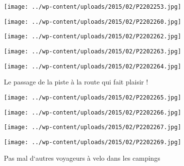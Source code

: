  

\begin{center} \texttt{[image: ../wp-content/uploads/2015/02/P2202253.jpg]} \end{center}

 

\begin{center} \texttt{[image: ../wp-content/uploads/2015/02/P2202260.jpg]} \end{center}

 

\begin{center} \texttt{[image: ../wp-content/uploads/2015/02/P2202262.jpg]} \end{center}

 

\begin{center} \texttt{[image: ../wp-content/uploads/2015/02/P2202263.jpg]} \end{center}

 

\begin{center} \texttt{[image: ../wp-content/uploads/2015/02/P2202264.jpg]} \end{center}

Le passage de la piste à la route qui fait plaisir !

 

\begin{center} \texttt{[image: ../wp-content/uploads/2015/02/P2202265.jpg]} \end{center}



\begin{center} \texttt{[image: ../wp-content/uploads/2015/02/P2202266.jpg]} \end{center}

 

\begin{center} \texttt{[image: ../wp-content/uploads/2015/02/P2202267.jpg]} \end{center}

 

\begin{center} \texttt{[image: ../wp-content/uploads/2015/02/P2202269.jpg]} \end{center}

Pas mal d`autres voyageurs à velo dans les campings

